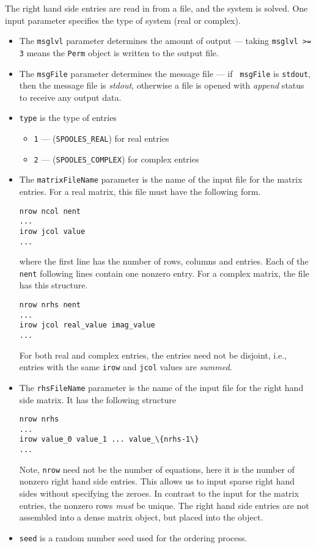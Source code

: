 \begin{enumerate}
The right hand side entries are read in from a file, and the system
is solved.
One input parameter specifies the type of system (real or
complex).  
\par
\begin{itemize}
\item
The {\tt msglvl} parameter determines the amount of output ---
taking {\tt msglvl >= 3} means the {\tt Perm} object is written
to the output file.
\item
The {\tt msgFile} parameter determines the message file --- if {\tt
msgFile} is {\tt stdout}, then the message file is {\it stdout},
otherwise a file is opened with {\it append} status to receive any
output data.
\item
{\tt type} is the type of entries
\begin{itemize}
\item {\tt 1} --- ({\tt SPOOLES\_REAL}) for real entries
\item {\tt 2} --- ({\tt SPOOLES\_COMPLEX}) for complex entries
\end{itemize}
\item
The {\tt matrixFileName} parameter is the name of the input file
for the matrix entries.
For a real matrix, this file must have the following form.
\begin{verbatim}
nrow ncol nent
...
irow jcol value
...
\end{verbatim}
where the first line has the number of rows, columns and entries.
Each of the {\tt nent} following lines contain one nonzero entry.
For a complex matrix, the file has this structure.
\begin{verbatim}
nrow nrhs nent
...
irow jcol real_value imag_value
...
\end{verbatim}
For both real and complex entries, the entries need not be
disjoint,
i.e., entries with the same {\tt irow} and {\tt jcol} values are
{\it summed}.
\item
The {\tt rhsFileName} parameter is the name of the input file for
the right hand side matrix.
It has the following structure
\begin{verbatim}
nrow nrhs
...
irow value_0 value_1 ... value_\{nrhs-1\}
...
\end{verbatim}
Note, {\tt nrow} need not be the number of equations, here it is
the number of nonzero right hand side entries.
This allows us to input sparse right hand sides without specifying
the zeroes.
In contrast to the input for the matrix entries, the nonzero rows
{\it must} be unique.
The right hand side entries are not assembled into a dense matrix
object, but placed into the object.
\item
{\tt seed} is a random number seed used for the ordering process.
\end{itemize}
\end{enumerate}
